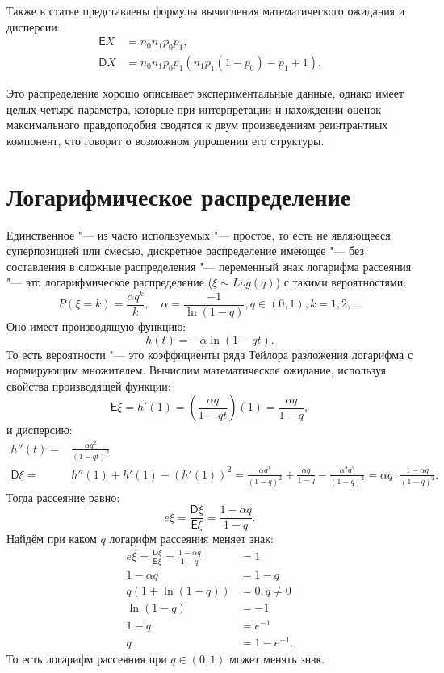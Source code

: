\documentclass[12pt, specialist, subf, substylefile = spbu_report.rtx]{disser}
\begin{document}
	Также в статье представлены формулы вычисления математического ожидания и дисперсии:
	\begin{align*}
		\mathsf{E} X &= n _0 n _1 p _0 p_1,\\
		\mathsf{D} X &= n _0 n _1 p _0 p_1(n _1 p _1(1 - p _0) - p _1 + 1).
	\end{align*}

	Это распределение хорошо описывает экспериментальные данные, однако имеет целых четыре параметра, которые при интерпретации и нахождении оценок максимального правдоподобия сводятся к двум произведениям реинтрантных компонент, что говорит о возможном упрощении его структуры.

	\section{Логарифмическое распределение}
	
	Единственное "--- из часто используемых "--- простое, то есть не являющееся суперпозицией или смесью, дискретное распределение имеющее "--- без составления в сложные распределения "--- переменный знак логарифма рассеяния "--- это логарифмическое распределение ($ \xi \sim Log(q) $) с такими вероятностями:
	\[
		P(\xi = k) = \frac {\alpha q ^k} {k},\quad \alpha = \frac {-1} {\ln (1 - q)}, q \in (0, 1), k = 1, 2, \dots
	\]
	Оно имеет производящую функцию:
	\[
		h(t) = -\alpha \ln (1 - qt).
	\]
	То есть вероятности "--- это коэффициенты ряда Тейлора разложения логарифма с нормирующим множителем. Вычислим математическое ожидание, используя свойства производящей функции:
	\[
		\mathsf{E} \xi = h' (1) = \left( \frac {\alpha q} {1 - qt} \right) (1) = \frac {\alpha q} {1 - q}, 
	\]
	и дисперсию:
	\[
		\begin{aligned}
			h'' (t) =& \frac {\alpha q ^2} {(1 - qt) ^2}\\
			\mathsf{D} \xi =& h''(1) + h'(1) - \left( h' (1) \right) ^2 = \frac {\alpha q ^2} {(1 - q) ^2} + \frac {\alpha q} {1 - q} - \frac {\alpha ^2 q ^2} {(1 - q) ^2} = \alpha q \cdot \frac {1 - \alpha q} {(1 - q) ^2}.
		\end{aligned}
	\]
	Тогда рассеяние равно:
	\[
		e\xi = \frac {\mathsf{D} \xi} {\mathsf{E} \xi} = \frac {1 - \alpha q} {1 - q}.
	\]
	Найдём при каком $ q $ логарифм рассеяния меняет знак:
	\[
		\begin{aligned}
			e\xi = \frac {\mathsf{D} \xi} {\mathsf{E} \xi} = \frac {1 - \alpha q} {1 - q} &= 1\\
			1 - \alpha q &= 1 - q\\
			q (1 + \ln (1 - q)) &= 0, q \not = 0\\
			\ln (1 - q) &= -1\\
			1 - q &= e ^{-1}\\
			q &= 1 - e ^{-1}.
		\end{aligned}
	\]
	То есть логарифм рассеяния при $ q \in (0, 1) $ может менять знак.
	
\end{document}
